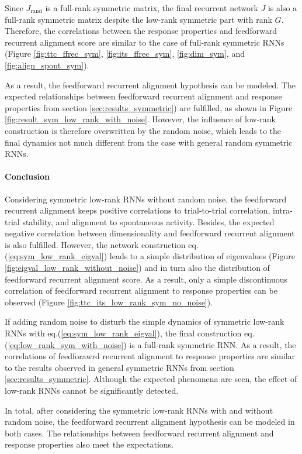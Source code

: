 \documentclass[11pt]{article}
\begin{document}
	Since $J_{\text{rand}}$ is a full-rank symmetric matrix, the final recurrent network $J$ is also a full-rank symmetric matrix despite the low-rank symmetric part with rank $G$. Therefore, the correlations between the response properties and feedforward recurrent alignment score are similar to the case of full-rank symmetric RNNs (Figure \ref{fig:ttc_ffrec_sym}, \ref{fig:its_ffrec_sym}, \ref{fig:dim_sym}, and \ref{fig:align_spont_sym}). 
	
	As a result, the feedforward recurrent alignment hypothesis can be modeled. The expected relationships between feedforward recurrent alignment and response properties from section \ref{sec:results_symmetric}) are fulfilled, as shown in Figure \ref{fig:result_sym_low_rank_with_noise}. However, the influence of low-rank construction is therefore overwritten by the random noise, which leads to the final dynamics not much different from the case with general random symmetric RNNs. 
	
	\paragraph{Conclusion}
	
	Considering symmetric low-rank RNNs without random noise, the feedforward recurrent alignment keeps positive correlations to trial-to-trial correlation, intra-trial stability, and alignment to spontaneous activity. Besides, the expected negative correlation between dimensionality and feedforward recurrent alignment is also fulfilled. However, the network construction eq.(\ref{eq:sym_low_rank_eigval}) leads to a simple distribution of eigenvalues (Figure \ref{fig:eigval_low_rank_without_noise}) and in turn also the distribution of feedforward recurrent alignment score. As a result, only a simple discontinuous correlation of feedforward recurrent alignment to response properties can be observed (Figure \ref{fig:ttc_its_low_rank_sym_no_noise}). 
	
	If adding random noise to disturb the simple dynamics of symmetric low-rank RNNs with eq.(\ref{eq:sym_low_rank_eigval}), the final construction eq.(\ref{eq:low_rank_sym_with_noise}) is a full-rank symmetric RNN. As a result, the correlations of feedforawrd recurrent alignment to response properties are similar to the results observed in general symmetric RNNs from section \ref{sec:results_symmetric}. Although the expected phenomena are seen, the effect of low-rank RNNs cannot be significantly detected. 
	
	In total, after considering the symmetric low-rank RNNs with and without random noise, the feedforward recurrent alignment hypothesis can be modeled in both cases. The relationships between feedforward recurrent alignment and response properties also meet the expectations. %
	
\end{document}
